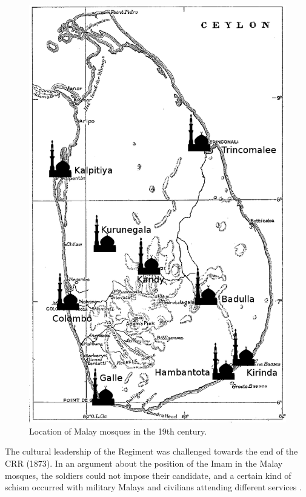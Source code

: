 \begin{figure}
    \centering
        \includegraphics[height=.3\textheight]{pics/Malaymosque}
 	\caption{Location of Malay mosques in the 19th century.}
    \label{fig:Malaymosques}
\end{figure}

The cultural leadership of the Regiment was challenged towards the
end of the CRR (1873). In an argument about the position of the
Imam in the Malay mosques, the soldiers could not impose their
candidate, and a certain kind of schism occurred with military
Malays and civilians attending different services
\citep[125]{Hussainmiya1990}.
 
